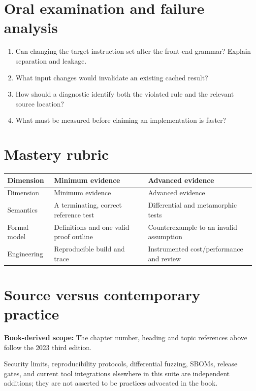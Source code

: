 \documentclass[10pt,letterpaper]{article}
\begin{document}
\section{Oral examination and failure analysis}
\begin{enumerate}
\item Can changing the target instruction set alter the front-end grammar? Explain separation and leakage.
\item What input changes would invalidate an existing cached result?
\item How should a diagnostic identify both the violated rule and the relevant source location?
\item What must be measured before claiming an implementation is faster?
\end{enumerate}

\section{Mastery rubric}
\begin{longtable}{|>{\raggedright\arraybackslash}p{}|>{\raggedright\arraybackslash}p{}|>{\raggedright\arraybackslash}p{}|}
\hline
Dimension & Minimum evidence & Advanced evidence\\ \hline\endfirsthead
\hline
Dimension & Minimum evidence & Advanced evidence\\ \hline\endhead
Semantics & A terminating, correct reference test & Differential and metamorphic tests\\ \hline
Formal model & Definitions and one valid proof outline & Counterexample to an invalid assumption\\ \hline
Engineering & Reproducible build and trace & Instrumented cost/performance and review\\ \hline
\end{longtable}

\section{Source versus contemporary practice}
\textbf{Book-derived scope:} The chapter number, heading and topic references above follow the 2023 third edition.\par\modern Security limits, reproducibility protocols, differential fuzzing, SBOMs, release gates, and current tool integrations elsewhere in this suite are independent additions; they are not asserted to be practices advocated in the book.
\end{document}
